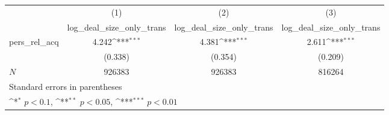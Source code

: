 {
\def\sym#1{\ifmmode^{#1}\else\(^{#1}\)\fi}
\begin{tabular}{l*{3}{c}}
\hline\hline
            &\multicolumn{1}{c}{(1)}&\multicolumn{1}{c}{(2)}&\multicolumn{1}{c}{(3)}\\
            &\multicolumn{1}{c}{log\_deal\_size\_only\_trans}&\multicolumn{1}{c}{log\_deal\_size\_only\_trans}&\multicolumn{1}{c}{log\_deal\_size\_only\_trans}\\
\hline
pers\_rel\_acq&       4.242\sym{***}&       4.381\sym{***}&       2.611\sym{***}\\
            &     (0.338)         &     (0.354)         &     (0.209)         \\
\hline
\(N\)       &      926383         &      926383         &      816264         \\
\hline\hline
\multicolumn{4}{l}{\footnotesize Standard errors in parentheses}\\
\multicolumn{4}{l}{\footnotesize \sym{*} \(p<0.1\), \sym{**} \(p<0.05\), \sym{***} \(p<0.01\)}\\
\end{tabular}
}
